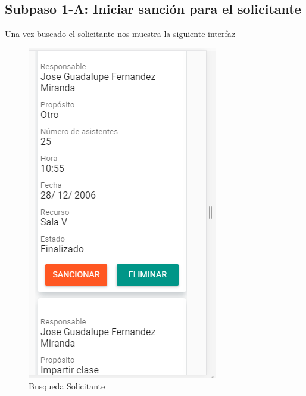 \subsection{Subpaso 1-A: Iniciar sanción para el solicitante}
Una vez buscado el solicitante nos muestra la siguiente interfaz
\begin{figure}[hbtp]

	\includegraphics[scale=0.3]{images/InterfazMovil/IUGS07_busqueda.PNG}
	\caption{Busqueda Solicitante}
	\end{figure}

